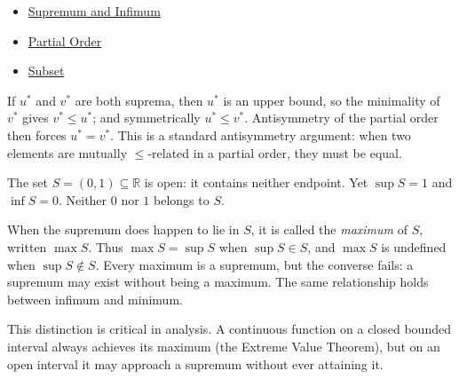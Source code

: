 \begin{dependencies}
\begin{itemize}
  \item \hyperref[def:sup-inf]{Supremum and Infimum}
  \item \hyperref[def:partial-order]{Partial Order}
  \item \hyperref[def:subset]{Subset}
\end{itemize}
\end{dependencies}

\begin{remark*}
If $u^*$ and $v^*$ are both suprema, then $u^*$ is an upper bound, so
the minimality of $v^*$ gives $v^* \leq u^*$; and symmetrically $u^* \leq v^*$.
Antisymmetry of the partial order then forces $u^* = v^*$.  This is a
standard antisymmetry argument: when two elements are mutually $\leq$-related
in a partial order, they must be equal.
\end{remark*}


\begin{remark*}
\label{rem:max-vs-sup}
The set $S = (0,1) \subseteq \mathbb{R}$ is open: it contains neither
endpoint.  Yet $\sup S = 1$ and $\inf S = 0$.  Neither $0$ nor $1$
belongs to $S$.

When the supremum does happen to lie in $S$, it is called the
\emph{maximum} of $S$, written $\max S$.  Thus $\max S = \sup S$ when
$\sup S \in S$, and $\max S$ is undefined when $\sup S \notin S$.
Every maximum is a supremum, but the converse fails: a supremum may
exist without being a maximum.  The same relationship holds between
infimum and minimum.

This distinction is critical in analysis.  A continuous function on a
closed bounded interval always achieves its maximum (the Extreme Value
Theorem), but on an open interval it may approach a supremum without
ever attaining it.
\end{remark*}


